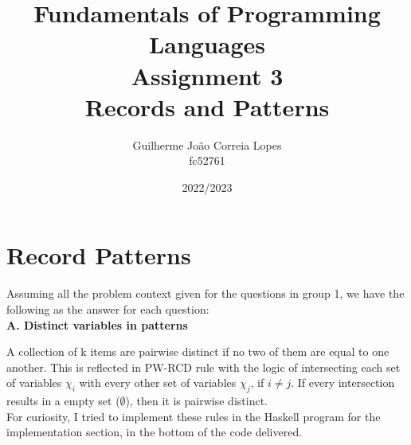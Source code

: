 \documentclass[a4paper]{article}
\title{
  \color{blue}Fundamentals of Programming Languages\\[1ex]
  Assignment 3\\[1ex]
  Records and Patterns}
\author{Guilherme João Correia Lopes\\
  fc52761
}
\date{2022/2023}
\begin{document}
\maketitle
\setlength{\parskip}{1ex}
\thispagestyle{empty}

\section{Record Patterns}
Assuming all the problem context given for the questions in group 1, we have the following as the answer for each question:\\
%

\textbf{A. Distinct variables in patterns}
A collection of k items are pairwise distinct if no two of them are equal to one another. This is reflected in PW-RCD rule with the logic of intersecting each set of variables $\chi_i$ with every other set of variables $\chi_j$, if $i \neq j$. If every intersection results in a empty set ($\emptyset$), then it is pairwise distinct.\\
For curiosity, I tried to implement these rules in the Haskell program for the implementation section, in the bottom of the code delivered. 
\\
\end{document}
